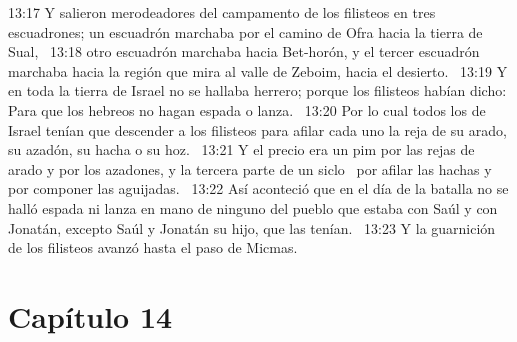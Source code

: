 13:17 Y salieron merodeadores del campamento de los filisteos en tres escuadrones; un escuadrón marchaba por el camino de Ofra hacia la tierra de Sual,  
13:18 otro escuadrón marchaba hacia Bet-horón, y el tercer escuadrón marchaba hacia la región que mira al valle de Zeboim, hacia el desierto.  
13:19 Y en toda la tierra de Israel no se hallaba herrero; porque los filisteos habían dicho: Para que los hebreos no hagan espada o lanza.  
13:20 Por lo cual todos los de Israel tenían que descender a los filisteos para afilar cada uno la reja de su arado, su azadón, su hacha o su hoz.  
13:21 Y el precio era un pim por las rejas de arado y por los azadones, y la tercera parte de un siclo  por afilar las hachas y por componer las aguijadas.  
13:22 Así aconteció que en el día de la batalla no se halló espada ni lanza en mano de ninguno del pueblo que estaba con Saúl y con Jonatán, excepto Saúl y Jonatán su hijo, que las tenían.  
13:23 Y la guarnición de los filisteos avanzó hasta el paso de Micmas.  
\section*{Capítulo 14 }

